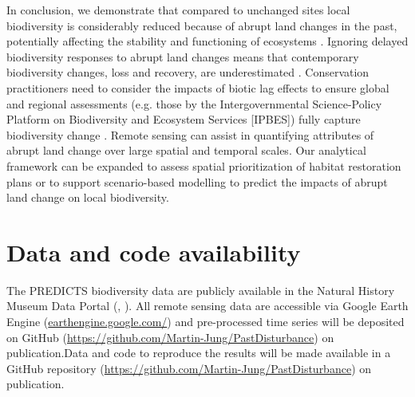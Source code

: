 In conclusion, we demonstrate that compared to unchanged sites local biodiversity is considerably reduced because of abrupt land changes in the past, potentially affecting the stability and functioning of ecosystems \citep{Hautier2015}. Ignoring delayed biodiversity responses to abrupt land changes means that contemporary biodiversity changes, loss and recovery, are underestimated \citep{Kuussaari2009,Essl2015}. Conservation practitioners need to consider the impacts of biotic lag effects to ensure global and regional assessments (e.g. those by the Intergovernmental Science-Policy Platform on Biodiversity and Ecosystem Services [IPBES]) fully capture biodiversity change \citep{Essl2015}. Remote sensing can assist in quantifying attributes of abrupt land change over large spatial and temporal scales. Our analytical framework can be expanded to assess spatial prioritization of habitat restoration plans or to support scenario-based modelling \citep{Ewers2009} to predict the impacts of abrupt land change on local biodiversity.

\section{Data and code availability}
\label{C03_05}
The PREDICTS biodiversity data are publicly available in the Natural History Museum Data Portal (, \cite{Hudson2016}). All remote sensing data are accessible via Google Earth Engine (\href{earthengine.google.com/}{earthengine.google.com/}) \citep{Gorelick2017} and pre-processed time series will be deposited on GitHub (\href{https://github.com/Martin-Jung/PastDisturbance}{https://github.com/Martin-Jung/PastDisturbance}) on publication.Data and code to reproduce the results will be made available in a GitHub repository (\href{https://github.com/Martin-Jung/PastDisturbance}{https://github.com/Martin-Jung/PastDisturbance}) on publication.

\clearpage
%

%  
